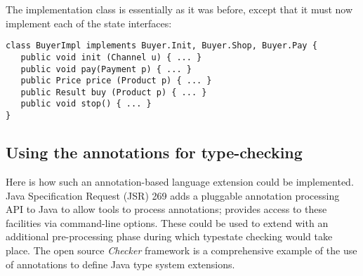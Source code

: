 The implementation class  is essentially as it was
before, except that it must now implement each of the state
interfaces:

\begin{lstlisting}
class BuyerImpl implements Buyer.Init, Buyer.Shop, Buyer.Pay {
   public void init (Channel u) { ... }
   public void pay(Payment p) { ... }
   public Price price (Product p) { ... }
   public Result buy (Product p) { ... }
   public void stop() { ... }
}
\end{lstlisting}

\subsection{Using the annotations for type-checking}

Here is how such an annotation-based language extension could be
implemented. Java Specification Request (JSR) 269 \cite{jsr269} adds a
pluggable annotation processing API to Java to allow tools to process
annotations;  provides access to these facilities via
command-line options. These could be used to extend  with
an additional pre-processing phase during which typestate checking
would take place. The open source \emph{Checker} framework
\cite{papi08,dietl11} is a comprehensive example of the use of
annotations to define Java type system extensions.
